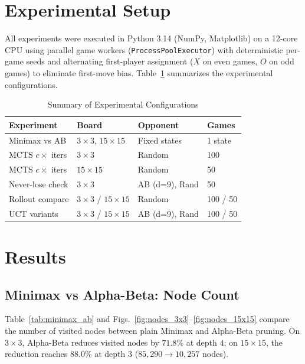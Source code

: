 \documentclass[conference]{IEEEtran}
\begin{document}
\section{Experimental Setup}
All experiments were executed in Python 3.14 (NumPy, Matplotlib) on a 12-core CPU using parallel game workers (\texttt{ProcessPoolExecutor}) with deterministic per-game seeds and alternating first-player assignment ($X$ on even games, $O$ on odd games) to eliminate first-move bias. Table~\ref{tab:setup} summarizes the experimental configurations.

\begin{table}[t]
\centering
\caption{Summary of Experimental Configurations}
\label{tab:setup}
\setlength{\tabcolsep}{3.5pt}
\begin{tabular}{@{}llll@{}}
\toprule
Experiment & Board & Opponent & Games \\
\midrule
Minimax vs AB & $3\times 3$, $15\times 15$ & Fixed states & 1 state \\
MCTS $c \times$ iters & $3\times 3$ & Random & 100 \\
MCTS $c \times$ iters & $15\times 15$ & Random & 50 \\
Never-lose check & $3\times 3$ & AB (d=9), Rand & 50 \\
Rollout compare & $3\times 3$ / $15\times 15$ & Random & 100 / 50 \\
UCT variants & $3\times 3$ / $15\times 15$ & AB (d=9), Rand & 100 / 50 \\
\bottomrule
\end{tabular}
\end{table}

\section{Results}

\subsection{Minimax vs Alpha-Beta: Node Count}
Table~\ref{tab:minimax_ab} and Figs.~\ref{fig:nodes_3x3}--\ref{fig:nodes_15x15} compare the number of visited nodes between plain Minimax and Alpha-Beta pruning. On $3\times 3$, Alpha-Beta reduces visited nodes by $71.8\%$ at depth $4$; on $15\times 15$, the reduction reaches $88.0\%$ at depth $3$ ($85{,}290 \rightarrow 10{,}257$ nodes).
\end{document}
